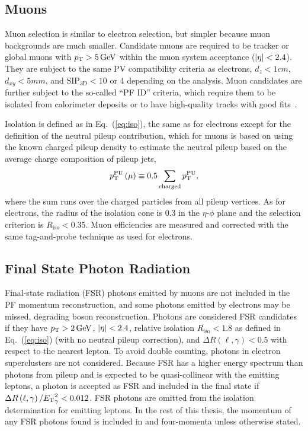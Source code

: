 \subsection{Muons}

Muon selection is similar to electron selection, but simpler because muon backgrounds are much smaller.
Candidate muons are required to be tracker or global muons with $p_\mathrm{T} > 5\,\mathrm{Ge\hspace{-.08em}V}$  within the muon system acceptance ($\lvert \eta \rvert < 2.4$).
They are subject to the same PV compatibility criteria as electrons, $d_z < 1\unit{cm}$, $d_{xy} < 5\unit{mm}$, and $\text{SIP}_\text{3D} < 10$ or 4 depending on the analysis.
Muon candidates are further subject to the so-called ``PF ID'' criteria, which require them to be isolated from calorimeter deposits or to have high-quality tracks with good fits~\cite{Sirunyan:2017ulk}.

Isolation is defined as in Eq.~(\ref{eq:iso}), the same as for electrons except for the definition of the neutral pileup contribution, which for muons is based on using the known charged pileup density to estimate the neutral pileup based on the average charge composition of pileup jets,
\begin{equation}
  p_\mathrm{T}^\text{PU}\left(\mathrm{\mu}\right) \equiv 0.5 \sum_\text{charged} p_\mathrm{T}^\text{PU},
\end{equation}
where the sum runs over the charged particles from all pileup vertices.
As for electrons, the radius of the isolation cone is 0.3 in the $\eta$-$\phi$ plane and the selection criterion is $R_\text{iso} < 0.35$.
Muon efficiencies are measured and corrected with the same tag-and-probe technique as used for electrons.


\subsection{Final State Photon Radiation}

Final-state radiation (FSR) photons emitted by muons are not included in the PF momentum reconstruction, and some photons emitted by electrons may be missed, degrading {\PZ} boson reconstruction.
Photons are considered FSR candidates if they have $p_\mathrm{T} > 2\,\mathrm{Ge\hspace{-.08em}V}$, $\lvert \eta \rvert < 2.4$, relative isolation $R_\text{iso} < 1.8$ as defined in Eq.~(\ref{eq:iso}) (with no neutral pileup correction), and $\Delta R \left(\ell, \gamma \right) < 0.5$ with respect to the nearest lepton.
To avoid double counting, photons in electron superclusters are not considered.
Because FSR has a higher energy spectrum than photons from pileup and is expected to be quasi-collinear with the emitting leptons, a photon is accepted as FSR and included in the {\ZZ} final state if $\Delta R \left( \ell, \gamma \right) / {E_\mathrm{T}}_\gamma^2 < 0.012$.
FSR photons are omitted from the isolation determination for emitting leptons.
In the rest of this thesis, the momentum of any FSR photons found is included in {\Zgs} and {\ZZ} four-momenta unless otherwise stated.


